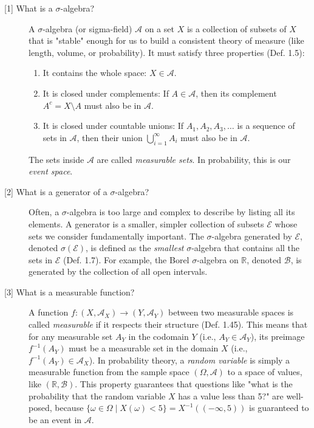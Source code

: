 \documentclass[11pt,a4paper]{article}
\theoremstyle{exercise_style}
\theoremstyle{definition}
\begin{document}
\begin{description}
    \item[\hypertarget{concept:sigma_algebra}{[1] What is a $\sigma$-algebra?}] A $\sigma$-algebra (or sigma-field) $\mathcal{A}$ on a set $X$ is a collection of subsets of $X$ that is "stable" enough for us to build a consistent theory of measure (like length, volume, or probability). It must satisfy three properties (Def. 1.5):
    \begin{enumerate}
        \item It contains the whole space: $X \in \mathcal{A}$.
        \item It is closed under complements: If $A \in \mathcal{A}$, then its complement $A^c = X \setminus A$ must also be in $\mathcal{A}$.
        \item It is closed under countable unions: If $A_1, A_2, A_3, \dots$ is a sequence of sets in $\mathcal{A}$, then their union $\bigcup_{i=1}^{\infty} A_i$ must also be in $\mathcal{A}$.
    \end{enumerate}
    The sets inside $\mathcal{A}$ are called \textit{measurable sets}. In probability, this is our \textit{event space}.

    \item[\hypertarget{concept:generator}{[2] What is a generator of a $\sigma$-algebra?}] Often, a $\sigma$-algebra is too large and complex to describe by listing all its elements. A generator is a smaller, simpler collection of subsets $\mathcal{E}$ whose sets we consider fundamentally important. The $\sigma$-algebra generated by $\mathcal{E}$, denoted $\sigma(\mathcal{E})$, is defined as the \textit{smallest} $\sigma$-algebra that contains all the sets in $\mathcal{E}$ (Def. 1.7). For example, the Borel $\sigma$-algebra on $\mathbb{R}$, denoted $\mathcal{B}$, is generated by the collection of all open intervals.

    \item[\hypertarget{concept:measurable_function}{[3] What is a measurable function?}] A function $f: (X, \mathcal{A}_X) \to (Y, \mathcal{A}_Y)$ between two measurable spaces is called \textit{measurable} if it respects their structure (Def. 1.45). This means that for any measurable set $A_Y$ in the codomain $Y$ (i.e., $A_Y \in \mathcal{A}_Y$), its preimage $f^{-1}(A_Y)$ must be a measurable set in the domain $X$ (i.e., $f^{-1}(A_Y) \in \mathcal{A}_X$). In probability theory, a \textit{random variable} is simply a measurable function from the sample space $(\Omega, \mathcal{A})$ to a space of values, like $(\mathbb{R}, \mathcal{B})$. This property guarantees that questions like "what is the probability that the random variable $X$ has a value less than 5?" are well-posed, because $\{ \omega \in \Omega \mid X(\omega) < 5 \} = X^{-1}((-\infty, 5))$ is guaranteed to be an event in $\mathcal{A}$.


\end{description}
\end{document}
